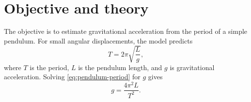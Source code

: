 \section{Objective and theory}

The objective is to estimate gravitational acceleration from the period of a
simple pendulum. For small angular displacements, the model predicts
\begin{equation}
  T = 2\pi\sqrt{\frac{L}{g}},
  \label{eq:pendulum-period}
\end{equation}
where $T$ is the period, $L$ is the pendulum length, and $g$ is gravitational
acceleration. Solving \autoref{eq:pendulum-period} for $g$ gives
\begin{equation}
  g = \frac{4\pi^2L}{T^2}.
  \label{eq:gravity-estimate}
\end{equation}
